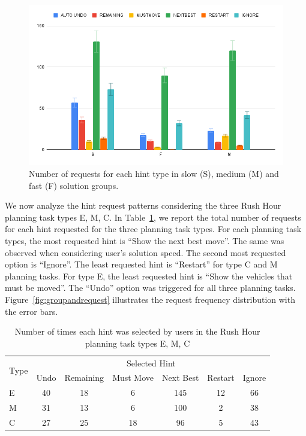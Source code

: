 \begin{figure}[tpb]
  \centering
\includegraphics[width=0.8\columnwidth]{img/speedreq.png}
  \caption{Number of requests for each hint type in slow (S), medium (M) and fast (F) solution groups.}
  \label{fig:speedrequest}
\end{figure}

We now analyze the hint request patterns considering the three Rush Hour planning task types E, M, C.
In Table~\ref{tab:groupsandrequests}, we report the total number of requests for each hint requested for the three planning task types.
For each planning task types, the most requested hint is ``Show the next best move''.
The same was observed when considering user's solution speed.
The second most requested option is ``Ignore''.
The least requested hint is ``Restart'' for type C and M planning tasks.
For type E, the least requested hint is ``Show the vehicles that must be moved''.
The ``Undo'' option was triggered for all three planning tasks.
Figure~\ref{fig:groupandrequest} illustrates the request frequency distribution with the error bars.
\begin{table}[tpb]
\begin{tabular}{|l|cccccc|}
\hline
\multirow{2}{*}{Type} & \multicolumn{6}{c|}{Selected Hint} \\ \cline{2-7} 
 & \multicolumn{1}{c|}{Undo} & \multicolumn{1}{c|}{Remaining} & \multicolumn{1}{c|}{Must Move} & \multicolumn{1}{c|}{Next Best} & \multicolumn{1}{c|}{Restart} & Ignore \\ \hline
E & 40 & 18 & 6 & 145 & 12 & 66 \\ \hline
M & 31 & 13 & 6 & 100 & 2 & 38 \\ \hline
C & 27 & 25 & 18 & 96 & 5 & 43 \\ \hline
\end{tabular}
\caption{Number of times each hint was selected by users in the Rush Hour planning task types E, M, C}
\label{tab:groupsandrequests}
\end{table}

